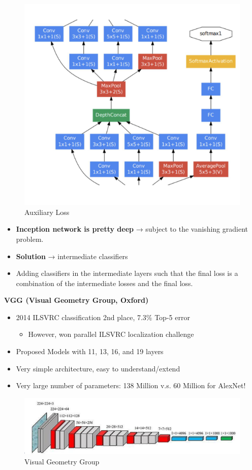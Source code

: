 \begin{figure}[h!t]
    \centering
    \includegraphics[width=0.4\linewidth]{auxiliaryloss.png}
    \caption{Auxiliary Loss}
    \label{fig:enter-label}
\end{figure}

\begin{itemize}
    \item \textbf{Inception network is pretty deep} → subject to the vanishing gradient problem.
    \item \textbf{Solution} → intermediate classifiers
    \item Adding classifiers in the intermediate layers such that the final loss is a combination of the intermediate losses and the final loss.
\end{itemize}

\textbf{VGG (Visual Geometry Group, Oxford)}

\begin{itemize}
    \item 2014 ILSVRC classification 2nd place, 7.3\% Top-5 error
    \begin{itemize}
        \item However, won parallel ILSVRC localization challenge
    \end{itemize}
    \item Proposed Models with 11, 13, 16, and 19 layers
    \item Very simple architecture, easy to understand/extend
    \item Very large number of parameters: 138 Million v.s. 60 Million for AlexNet!
\end{itemize}

\begin{figure}[h!t]
    \centering
    \includegraphics[width=0.75\linewidth]{vgg.png}
    \caption{Visual Geometry Group}
    \label{fig:enter-label}
\end{figure}

